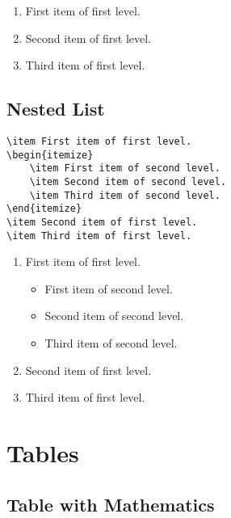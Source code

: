 \begin{enumerate}
    \item First item of first level.
    \item Second item of first level.
    \item Third item of first level.
\end{enumerate}

\subsection*{Nested List}
\label{subsec:nested-list}

\begin{lstlisting}[caption={A nested list.}]
\item First item of first level.
\begin{itemize}
    \item First item of second level.
    \item Second item of second level.
    \item Third item of second level.
\end{itemize}
\item Second item of first level.
\item Third item of first level.
\end{lstlisting}

\begin{enumerate}
    \item First item of first level.
    \begin{itemize}
        \item First item of second level.
        \item Second item of second level.
        \item Third item of second level.
    \end{itemize}
    \item Second item of first level.
    \item Third item of first level.
\end{enumerate}

\section*{Tables}
\label{sec:tables}

\subsection*{Table with Mathematics}
\label{subsec:table-with-mathematics}

